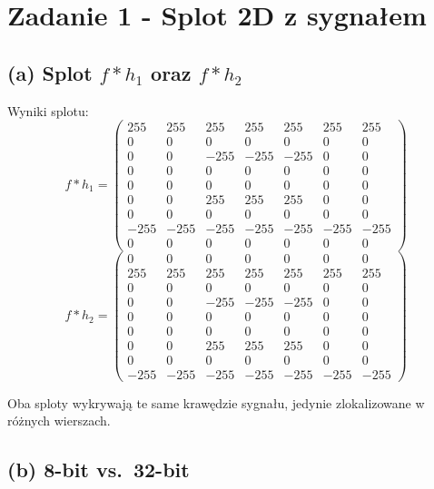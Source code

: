 \documentclass[12pt,a4paper,oneside,openany,oneauthor,masterthesis,deansoffice]{mfipl}
\begin{document}
\section*{Zadanie 1 - Splot 2D z sygnałem}


\subsection*{(a) Splot $f * h_1$ oraz $f * h_2$}

Wyniki splotu:
\[
f * h_1 = \begin{pmatrix}
255 & 255 & 255 & 255 & 255 & 255 & 255 \\
0 & 0 & 0 & 0 & 0 & 0 & 0 \\
0 & 0 & -255 & -255 & -255 & 0 & 0 \\
0 & 0 & 0 & 0 & 0 & 0 & 0 \\
0 & 0 & 0 & 0 & 0 & 0 & 0 \\
0 & 0 & 255 & 255 & 255 & 0 & 0 \\
0 & 0 & 0 & 0 & 0 & 0 & 0 \\
-255 & -255 & -255 & -255 & -255 & -255 & -255 \\
0 & 0 & 0 & 0 & 0 & 0 & 0
\end{pmatrix}
\]
\[
f * h_2 = \begin{pmatrix}
0 & 0 & 0 & 0 & 0 & 0 & 0 \\
255 & 255 & 255 & 255 & 255 & 255 & 255 \\
0 & 0 & 0 & 0 & 0 & 0 & 0 \\
0 & 0 & -255 & -255 & -255 & 0 & 0 \\
0 & 0 & 0 & 0 & 0 & 0 & 0 \\
0 & 0 & 0 & 0 & 0 & 0 & 0 \\
0 & 0 & 255 & 255 & 255 & 0 & 0 \\
0 & 0 & 0 & 0 & 0 & 0 & 0 \\
-255 & -255 & -255 & -255 & -255 & -255 & -255
\end{pmatrix}
\]

Oba sploty wykrywają te same krawędzie sygnału, jedynie zlokalizowane w różnych wierszach.

\subsection*{(b) 8-bit vs.\ 32-bit}
\end{document}
